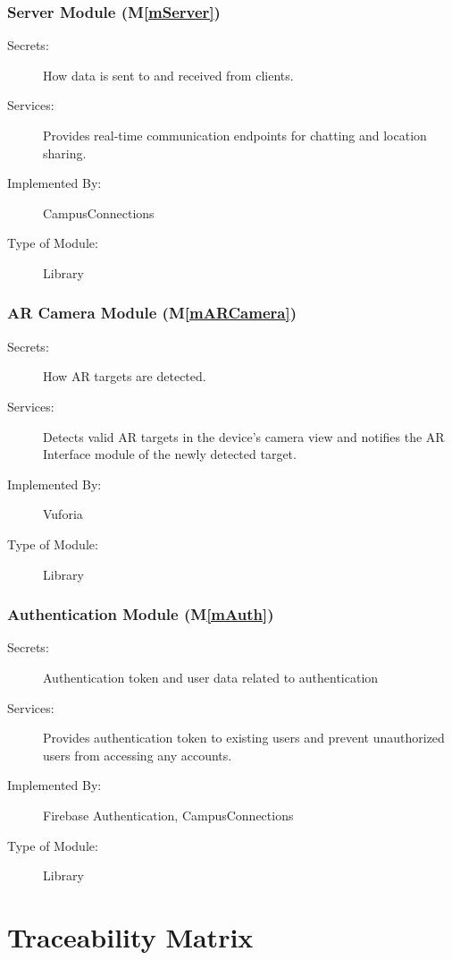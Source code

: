 \documentclass[12pt, titlepage]{article}
\newcommand{\mref}[1]{M\ref{#1}}
\begin{document}
\subsubsection{Server Module (\mref{mServer})}
\begin{description}
\item[Secrets:]How data is sent to and received from clients.
\item[Services:]Provides real-time communication endpoints for chatting and location sharing.
\item[Implemented By:] CampusConnections
\item[Type of Module:] Library
\end{description}

\subsubsection{AR Camera Module (\mref{mARCamera})}
\begin{description}
\item[Secrets:]How AR targets are detected.
\item[Services:]Detects valid AR targets in the device's camera view and notifies the AR Interface module of the newly detected target.
\item[Implemented By:] Vuforia
\item[Type of Module:] Library
\end{description}

\subsubsection{Authentication Module (\mref{mAuth})}
\begin{description}
\item[Secrets:]Authentication token and user data related to authentication
\item[Services:]Provides authentication token to existing users and prevent unauthorized users from accessing any accounts.
\item[Implemented By:] Firebase Authentication, CampusConnections
\item[Type of Module:] Library
\end{description}

\section{Traceability Matrix} \label{SecTM}
\end{document}
